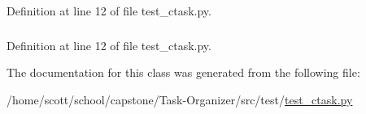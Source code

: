 \-Definition at line 12 of file test\-\_\-ctask.\-py.

\hypertarget{classtest__ctask_1_1TestCLIParser_a8a419d6c97f1d734ce5058933d7137c3}{
\subsubsection[{title}]{}}
\label{classtest__ctask_1_1TestCLIParser_a8a419d6c97f1d734ce5058933d7137c3}


\-Definition at line 12 of file test\-\_\-ctask.\-py.



\-The documentation for this class was generated from the following file\-:\begin{DoxyCompactItemize}
\item 
/home/scott/school/capstone/\-Task-\/\-Organizer/src/test/\hyperlink{test__ctask_8py}{test\-\_\-ctask.\-py}\end{DoxyCompactItemize}
